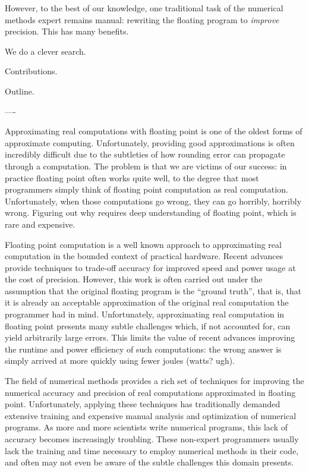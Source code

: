 \documentclass[paper.tex]{subfiles}
\begin{document}
However, to the best of our knowledge, one traditional task of the
numerical methods expert remains manual: rewriting the floating
program to \textit{improve} precision.  This has many benefits.

We do a clever search.

Contributions.

Outline.

----

Approximating real computations with floating point is one of the oldest
forms of approximate computing.  Unfortunately, providing good
approximations is often incredibly difficult due to the subtleties of how
rounding error can propagate through a computation.  The problem is that we
are victims of our success: in practice floating point often works quite
well, to the degree that most programmers simply think of floating point
computation as real computation.  Unfortunately, when those computations go
wrong, they can go horribly, horribly wrong.  Figuring out why requires
deep understanding of floating point, which is rare and expensive.

Floating point computation is a well known approach to approximating real
computation in the bounded context of practical hardware.  Recent advances
provide techniques to trade-off accuracy for improved speed and power usage
at the cost of precision.  However, this work is often carried out under
the assumption that the original floating program is the ``ground truth'',
that is, that it is already an acceptable approximation of the original
real computation the programmer had in mind.  Unfortunately, approximating
real computation in floating point presents many subtle challenges which,
if not accounted for, can yield arbitrarily large errors.  This limits the
value of recent advances improving the runtime and power efficiency of such
computations: the wrong answer is simply arrived at more quickly using
fewer joules (watts? ugh).

The field of numerical methods provides a rich set of techniques for
improving the numerical accuracy and precision of real computations
approximated in floating point.  Unfortunately, applying these techniques
has traditionally demanded extensive training and expensive manual analysis
and optimization of numerical programs.  As more and more scientists write
numerical programs, this lack of accuracy becomes increasingly troubling.
These non-expert programmers usually lack the training and time necessary
to employ numerical methods in their code, and often may not even be aware
of the subtle challenges this domain presents.
\end{document}
